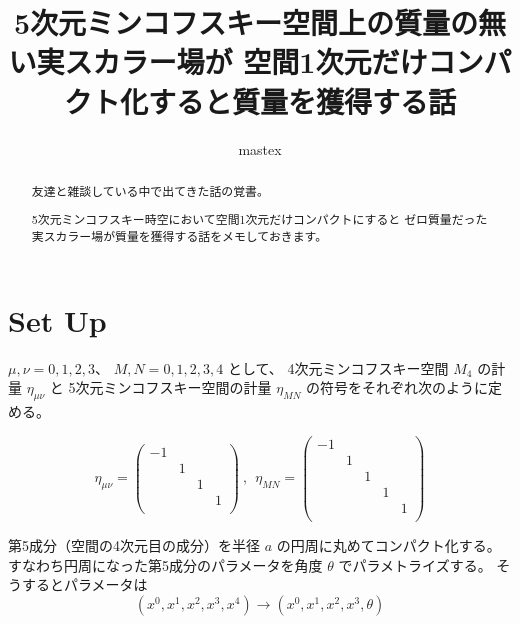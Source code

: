 \documentclass{article}
\title{
5次元ミンコフスキー空間上の質量の無い実スカラー場が \newline 空間1次元だけコンパクト化すると質量を獲得する話
}
\author{
mastex
}
\begin{document}
\maketitle

\begin{abstract}
	友達と雑談している中で出てきた話の覚書。

	5次元ミンコフスキー時空において空間1次元だけコンパクトにすると
	ゼロ質量だった実スカラー場が質量を獲得する話をメモしておきます。
\end{abstract}

\section{Set Up}

$\mu,\nu = 0,1,2,3$、
$M,N=0,1,2,3,4$
として、
4次元ミンコフスキー空間
$M_{4}$
の計量
$\eta_{\mu \nu}$
と
5次元ミンコフスキー空間の計量
$\eta_{MN}$
の符号をそれぞれ次のように定める。

$$
	\eta_{\mu \nu}
	=
	\begin{pmatrix}
		-1 &   &   &   \\
		   & 1 &   &   \\
		   &   & 1 &   \\
		   &   &   & 1 \\
	\end{pmatrix}
	\ , \ \
	\eta_{MN}
	=
	\begin{pmatrix}
		-1 &   &   &   &   \\
		   & 1 &   &   &   \\
		   &   & 1 &   &   \\
		   &   &   & 1 &   \\
		   &   &   &   & 1 \\
	\end{pmatrix}
$$

第5成分（空間の4次元目の成分）を半径 $a$ の円周に丸めてコンパクト化する。
すなわち円周になった第5成分のパラメータを角度
$\theta$
でパラメトライズする。
そうするとパラメータは
$$
	(x^0, x^1, x^2, x^3, x^4)
	\to
	(x^0, x^1, x^2, x^3, \theta)
$$
\end{document}
